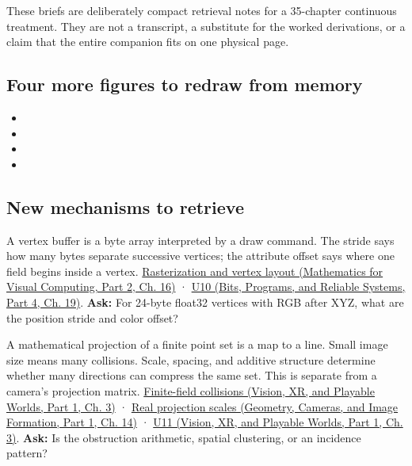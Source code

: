 These briefs are deliberately compact retrieval notes for a 35-chapter continuous treatment. They are not a transcript, a substitute for the worked derivations, or a claim that the entire companion fits on one physical page.

\subsection{Four more figures to redraw from memory}\label{appendix-a8f634b076b5-four-more-figures-to-redraw-from-memory}

\hypertarget{appendix-a8f634b076b5-four-more-figures-to-redraw-from-memory}{}

\begin{itemize}
\tightlist
\item
\item
\item
\item
\end{itemize}

\subsection{New mechanisms to retrieve}\label{appendix-a8f634b076b5-new-mechanisms-to-retrieve}

\hypertarget{appendix-a8f634b076b5-new-mechanisms-to-retrieve}{}

A vertex buffer is a byte array interpreted by a draw command. The stride says how many bytes separate successive vertices; the attribute offset says where one field begins inside a vertex. \href{../02-Mathematics-for-Visual-Computing-P02/main.pdf\#03-visual-computing-i-ch012-rasterization-coverage-and-depth}{Rasterization and vertex layout (Mathematics for Visual Computing, Part 2, Ch. 16)} · \href{../01-Bits-Programs-and-Reliable-Systems-P04/main.pdf\#03-visual-computing-i-ch018-figure-u10---vertex-fetch-uses-a-stride-and-byte-offset}{U10 (Bits, Programs, and Reliable Systems, Part 4, Ch. 19)}. \textbf{Ask:} For 24-byte float32 vertices with RGB after XYZ, what are the position stride and color offset?

A mathematical projection of a finite point set is a map to a line. Small image size means many collisions. Scale, spacing, and additive structure determine whether many directions can compress the same set. This is separate from a camera's projection matrix. \href{../07-Vision-XR-and-Playable-Worlds-P01/main.pdf\#04-visual-computing-ii-ch032-finite-field-projections-turn-image-size-into-collision-counts}{Finite-field collisions (Vision, XR, and Playable Worlds, Part 1, Ch. 3)} · \href{../03-Geometry-Cameras-and-Image-Formation-P01/main.pdf\#04-visual-computing-ii-ch033-real-projections-add-scale-spacing-and-incidence-geometry}{Real projection scales (Geometry, Cameras, and Image Formation, Part 1, Ch. 14)} · \href{../07-Vision-XR-and-Playable-Worlds-P01/main.pdf\#04-visual-computing-ii-ch032-figure-u11---finite-grid-projections-expose-collision-counts}{U11 (Vision, XR, and Playable Worlds, Part 1, Ch. 3)}. \textbf{Ask:} Is the obstruction arithmetic, spatial clustering, or an incidence pattern?

